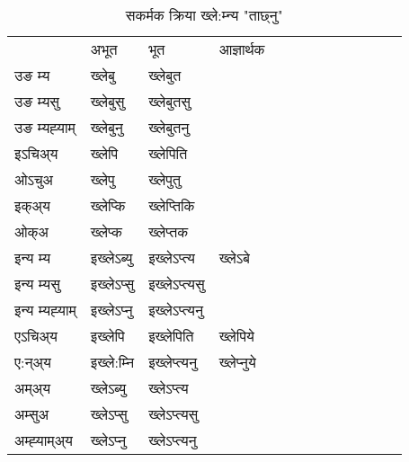 \begin{table}[H]
\label{ep.vt} \centering
\caption{सकर्मक क्रिया  ख्ले:म्‍न्य  "ताछ्नु"  }
\begin{tabular}{l|l|l|l|l|l|l|l|l|l|l|l|l}  \toprule
&अभूत & भूत & आज्ञार्थक \\ 
उङ म्य &ख्लेबु &ख्लेबुत \\ 
उङ म्यसु &ख्लेबुसु &ख्लेबुतसु \\ 
उङ म्यह्‍याम् &ख्लेबुनु &ख्लेबुतनु \\ 
इऽचिअ्य  &ख्लेपि &ख्लेपिति   \\ 
ओऽचुअ &ख्लेपु &ख्लेपुतु   \\ 
इक्अ्य &ख्लेप्कि &ख्लेप्‍तिकि   \\ 
ओक्अ &ख्लेप्क &ख्लेप्‍तक   \\ 
इन्य म्य& इख्लेऽब्यु  & इख्लेऽप्‍त्य &ख्लेऽबे  \\ 
इन्य म्यसु & इख्लेऽप्सु  & इख्लेऽप्‍त्यसु   \\ 
इन्य म्यह्‍याम् & इख्लेऽप्‍नु  & इख्लेऽप्‍त्यनु   \\ 
एऽचिअ्य & इख्लेपि & इख्लेपिति &ख्लेपिये    \\ 
ए:न्अ्य & इख्ले:म्‍नि  & इख्लेप्‍त्यनु &ख्लेप्‍नुये  \\ 
अम्अ्य & ख्लेऽब्यु  & ख्लेऽप्‍त्य  \\ 
अम्सुअ & ख्लेऽप्सु & ख्लेऽप्‍त्यसु  \\ 
अम्ह्‍याम्अ्य & ख्लेऽप्‍नु  & ख्लेऽप्‍त्यनु \\ 
\bottomrule
\end{tabular}
\end{table}


